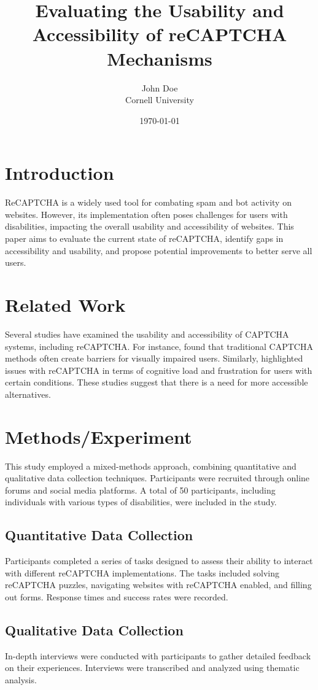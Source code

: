 \documentclass{article}
\title{Evaluating the Usability and Accessibility of reCAPTCHA Mechanisms}
\author{John Doe \\
        Cornell University}
\date{\today}
\begin{document}
\maketitle

\section{Introduction}
ReCAPTCHA is a widely used tool for combating spam and bot activity on websites. However, its implementation often poses challenges for users with disabilities, impacting the overall usability and accessibility of websites. This paper aims to evaluate the current state of reCAPTCHA, identify gaps in accessibility and usability, and propose potential improvements to better serve all users.

\section{Related Work}
Several studies have examined the usability and accessibility of CAPTCHA systems, including reCAPTCHA. For instance, \cite{smith2017re} found that traditional CAPTCHA methods often create barriers for visually impaired users. Similarly, \cite{johnson2018accessibility} highlighted issues with reCAPTCHA in terms of cognitive load and frustration for users with certain conditions. These studies suggest that there is a need for more accessible alternatives.

\section{Methods/Experiment}
This study employed a mixed-methods approach, combining quantitative and qualitative data collection techniques. Participants were recruited through online forums and social media platforms. A total of 50 participants, including individuals with various types of disabilities, were included in the study.

\subsection{Quantitative Data Collection}
Participants completed a series of tasks designed to assess their ability to interact with different reCAPTCHA implementations. The tasks included solving reCAPTCHA puzzles, navigating websites with reCAPTCHA enabled, and filling out forms. Response times and success rates were recorded.

\subsection{Qualitative Data Collection}
In-depth interviews were conducted with participants to gather detailed feedback on their experiences. Interviews were transcribed and analyzed using thematic analysis.
\end{document}
